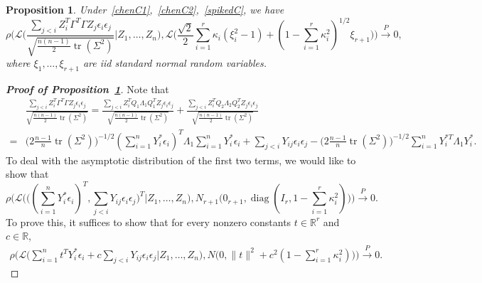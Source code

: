 \documentclass[3p]{elsarticle}
\DeclareMathOperator{\mytr}{tr}
\DeclareMathOperator{\mydiag}{diag}
\theoremstyle{plain}
\newtheorem{proposition}{\quad\quad Proposition}
\theoremstyle{definition}
\theoremstyle{remark}
\begin{document}
\begin{proposition}\label{nomuProp}
    Under~\eqref{chenC1},~\eqref{chenC2},~\eqref{spikedC},
    we have
    $$
        \rho\Bigg(
        \mathcal{L}\bigg(
    \frac{\sum_{j<i} Z_i^T \Gamma^T \Gamma Z_j \epsilon_i \epsilon_j}
    {\sqrt{\frac{n(n-1)}{2}\mytr(\Sigma^2)}}
        \bigg|Z_1,\ldots,Z_n\bigg)
        ,
        \mathcal{L}\big(\frac{\sqrt{2}}{2}\sum_{i=1}^r \kappa_i (\xi_i^2-1) + (1-\sum_{i=1}^r \kappa_i^2)^{1/2}\xi_{r+1}\big)
        \Bigg)
        \xrightarrow{P}0,
    $$
    where $\xi_1,\ldots,\xi_{r+1}$ are iid standard normal random variables.
\end{proposition}
\begin{proof}[\textbf{Proof of Proposition~\ref{nomuProp}}]
    Note that
    $$
    \begin{aligned}
        &
    \frac{\sum_{j<i} Z_i^T \Gamma^T \Gamma Z_j \epsilon_i \epsilon_j}
    {\sqrt{\frac{n(n-1)}{2}\mytr(\Sigma^2)}}
        =
        \frac{\sum_{j<i}Z_i^T Q_1 \Lambda_1 Q_1^T Z_j \epsilon_i \epsilon_j}
    {\sqrt{\frac{n(n-1)}{2}\mytr(\Sigma^2)}}
        +
        \frac{\sum_{j<i}Z_i^T Q_2 \Lambda_2 Q_2^T Z_j \epsilon_i \epsilon_j}
    {\sqrt{\frac{n(n-1)}{2}\mytr(\Sigma^2)}}
    \\
        =&
        \big(2\frac{n-1}{n}\mytr(\Sigma^2)\big)^{-1/2}(\sum_{i=1}^n  Y_i^* \epsilon_i)^T \Lambda_1 \sum_{i=1}^n  Y_i^* \epsilon_i
        +
        \sum_{j<i} Y_{ij} \epsilon_i \epsilon_j
        -
        \big(2\frac{n-1}{n}\mytr(\Sigma^2)\big)^{-1/2}
        \sum_{i=1}^n Y_i^{*T}\Lambda_1 Y_i^*
        .
    \end{aligned}
    $$
    To deal with the asymptotic distribution of the first two terms, we would like to show that
    \begin{equation}\label{xz:toProve}
    \rho\Big(\mathcal{L}\big(
    \big( (\sum_{i=1}^n Y_i^* \epsilon_i)^T ,
    \sum_{j<i} Y_{ij} \epsilon_i \epsilon_j \big)^T
    \big|Z_1,\ldots,Z_n\big), N_{r+1}\big(0_{r+1},\mydiag(I_r,1-\sum_{i=1}^r \kappa_i^2)\big)\Big)
        \xrightarrow{P}0.
    \end{equation}
    To prove this, it suffices to show that for every nonzero constants $t\in\mathbb{R}^r$ and $c\in\mathbb{R}$,
    \begin{equation*}
        \begin{aligned}
            \rho\Big(\mathcal{L}\big( \sum_{i=1}^n t^T Y_i^* \epsilon_i+c\sum_{j<i} Y_{ij} \epsilon_i \epsilon_j \big| Z_1,\ldots,Z_n\big)
            ,
            N\big(0,\|t\|^2+c^2(1-\sum_{i=1}^r \kappa_i^2)\big)\Big)\xrightarrow{P} 0.

\end{aligned}
\end{equation*}
\end{proof}
\end{document}
